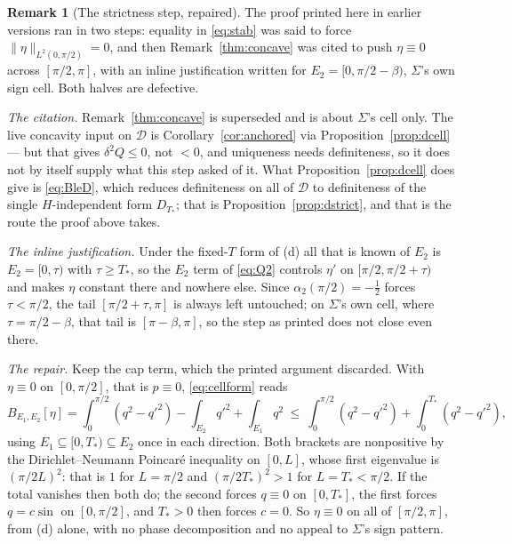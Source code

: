 \documentclass[11pt]{article}
\theoremstyle{definition}
\newtheorem{remark}[theorem]{Remark}
\newcommand{\Sig}{\Sigma}
\begin{document}
\begin{remark}[The strictness step, repaired]\label{rem:v32}
The proof printed here in earlier versions ran in two steps: equality in \eqref{eq:stab} was
said to force $\|\eta\|_{L^2(0,\pi/2)}=0$, and then Remark~\ref{thm:concave} was cited to push
$\eta\equiv0$ across $[\pi/2,\pi]$, with an inline justification written for
$E_2=[0,\pi/2-\beta)$, $\Sig$'s own sign cell. Both halves are defective.

\emph{The citation.} Remark~\ref{thm:concave} is superseded and is about $\Sig$'s cell only.
The live concavity input on $\mathcal D$ is Corollary~\ref{cor:anchored} via
Proposition~\ref{prop:dcell} --- but that gives $\delta^2Q\le0$, not $<0$, and uniqueness
needs definiteness, so it does not by itself supply what this step asked of it. What
Proposition~\ref{prop:dcell} does give is \eqref{eq:BleD}, which reduces definiteness on all
of $\mathcal D$ to definiteness of the single $H$-independent form $D_{T_\ast}$; that is
Proposition~\ref{prop:dstrict}, and that is the route the proof above takes.

\emph{The inline justification.} Under the fixed-$T$ form of (d) all that is known of $E_2$ is
$E_2=[0,\tau)$ with $\tau\ge T_\ast$, so the $E_2$ term of \eqref{eq:Q2} controls $\eta'$ on
$[\pi/2,\pi/2+\tau)$ and makes $\eta$ constant there and nowhere else. Since $\alpha_2(\pi/2)
=-\tfrac12$ forces $\tau<\pi/2$, the tail $[\pi/2+\tau,\pi]$ is always left untouched; on
$\Sig$'s own cell, where $\tau=\pi/2-\beta$, that tail is $[\pi-\beta,\pi]$, so the step as
printed does not close even there.

\emph{The repair.} Keep the cap term, which the printed argument discarded. With
$\eta\equiv0$ on $[0,\pi/2]$, that is $p\equiv0$, \eqref{eq:cellform} reads
\[
  B_{E_1,E_2}[\eta]=\int_0^{\pi/2}(q^2-q'^2)-\int_{E_2}q'^2+\int_{E_1}q^2
  \ \le\ \int_0^{\pi/2}(q^2-q'^2)+\int_0^{T_\ast}(q^2-q'^2) ,
\]
using $E_1\subseteq[0,T_\ast)\subseteq E_2$ once in each direction. Both brackets are
nonpositive by the Dirichlet--Neumann Poincaré inequality on $[0,L]$, whose first eigenvalue
is $(\pi/2L)^2$: that is $1$ for $L=\pi/2$ and $(\pi/2T_\ast)^2>1$ for $L=T_\ast<\pi/2$. If
the total vanishes then both do; the second forces $q\equiv0$ on $[0,T_\ast]$, the first
forces $q=c\sin$ on $[0,\pi/2]$, and $T_\ast>0$ then forces $c=0$. So $\eta\equiv0$ on all of
$[\pi/2,\pi]$, from (d) alone, with no phase decomposition and no appeal to $\Sig$'s sign
pattern.


\end{remark}
\end{document}
